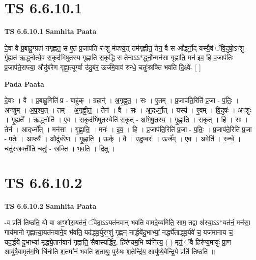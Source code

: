 \documentclass[17pt]{extarticle}
\begin{document}
\section*{ TS 6.6.10.1 }

\textbf{TS 6.6.10.1 } \newline
\textbf{Samhita Paata} \newline

दे॒वा वै प्र॒बाहु॒ग्ग्रहा॑-नगृह्णत॒ स ए॒तं प्र॒जाप॑ति-रꣳ॒॒शु-म॑पश्य॒त् तम॑गृह्णीत॒ तेन॒ वै स आ᳚र्द्ध्नो॒द्-यस्यै॒वं ॅवि॒दुषो॒ऽꣳ॒शु-र्गृ॒ह्यत॑ ऋ॒द्ध्नोत्ये॒व स॒कृद॑भिषुतस्य गृह्णाति स॒कृद्धि स तेनाऽऽ*र्द्ध्नो॒न्मन॑सा गृह्णाति॒ मन॑ इव॒ हि प॒जाप॑तिः प्र॒जाप॑ते॒राप्त्या॒ औदु॑बंरेण गृह्णा॒त्यूर्ग्वा उ॑दु॒बंर॒ ऊर्ज॑मे॒वाव॑ रुन्धे॒ चतुः॑स्रक्ति भवति दि॒क्ष्वे॑- [  ] \newline

\textbf{Pada Paata} \newline

दे॒वाः । वै । प्र॒बाहु॒गिति॑ प्र - बाहु॑क् । ग्रहान्॑ । अ॒गृ॒ह्ण॒त॒ । सः । ए॒तम् । प्र॒जाप॑ति॒रिति॑ प्र॒जा - प॒तिः॒ । अꣳ॒॒शुम् । अ॒प॒श्य॒त् । तम् । अ॒गृ॒ह्णी॒त॒ । तेन॑ । वै । सः । आ॒द्‌र्ध्नो॒त् । यस्य॑ । ए॒वम् । वि॒दुषः॑ । अꣳ॒॒शुः । गृ॒ह्यते᳚ । ऋ॒द्ध्नोति॑ । ए॒व । स॒कृद॑भिषुत॒स्येति॑ स॒कृत् - अ॒भि॒षु॒त॒स्य॒ । गृ॒ह्णा॒ति॒ । स॒कृत् । हि । सः । तेन॑ । आद्‌र्ध्नो᳚त् । मन॑सा । गृ॒ह्णा॒ति॒ । मनः॑ । इ॒व॒ । हि । प्र॒जाप॑ति॒रिति॑ प्र॒जा - प॒तिः॒ । प्र॒जाप॑ते॒रिति॑ प्र॒जा - प॒तेः॒ । आप्त्यै᳚ । औदु॑बंरेण । गृ॒ह्णा॒ति॒ । ऊर्क् । वै । उ॒दु॒म्बरः॑ । ऊर्ज᳚म् । ए॒व । अवेति॑ । रु॒न्धे॒ । चतु॑स्स्र॒क्तीति॒ चतुः॑ - स्र॒क्ति॒ । भ॒व॒ति॒ । दि॒क्षु ।  \newline




\section*{ TS 6.6.10.2 }

\textbf{TS 6.6.10.2 } \newline
\textbf{Samhita Paata} \newline

-व प्रति॑ तिष्ठति॒ यो वा अꣳ॒॒शोरा॒यत॑नं॒ ॅवेदा॒ऽऽयत॑नवान् भवति वामदे॒व्यमिति॒ साम॒ तद्वा अ॑स्या॒ऽऽ*यत॑नं॒ मन॑सा॒ गाय॑मानो गृह्णात्या॒यत॑नवाने॒व भ॑वति॒ यद॑द्ध्व॒र्युरꣳ॒॒शुं गृ॒ह्णन् नार्द्धये॑दु॒भाभ्यां॒ नर्द्ध्ये॑ताद्ध्व॒र्यवे॑ च॒ यज॑मानाय च॒ यद॒र्द्धये॑-दु॒भाभ्या॑-मृद्ध्ये॒तान॑वानं गृह्णाति॒ सैवास्यर्द्धि॒र॒. हिर॑ण्यम॒भि व्य॑नित्य॒ ( )-मृतं॒ ॅवै हिर॑ण्य॒मायुः॑ प्रा॒ण आयु॑षै॒वामृत॑म॒भि धि॑नोति श॒तमा॑नं भवति श॒तायुः॒ पुरु॑षः श॒तेन्द्रि॑य॒ आयु॑ष्ये॒वेन्द्रि॒ये प्रति॑ तिष्ठति ॥ \newline
\end{document}
